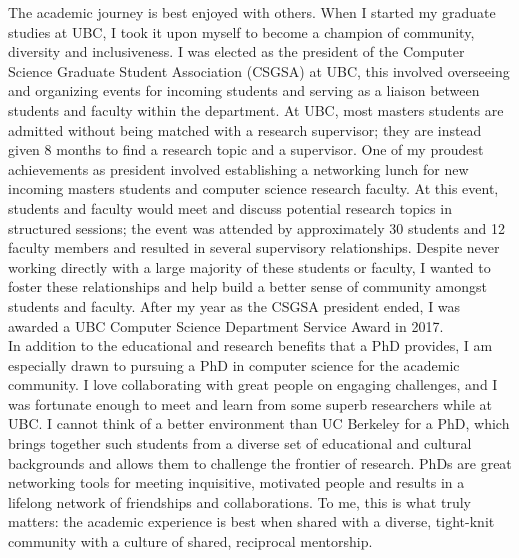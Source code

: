 \documentclass[10pt]{article} %
\begin{document}
The academic journey is best enjoyed with others. When I started my graduate studies at UBC, I took it upon myself to become a champion of community, diversity and inclusiveness. I was elected as the president of the Computer Science Graduate Student Association (CSGSA) at UBC, this involved overseeing and organizing events for incoming students and serving as a liaison between students and faculty within the department. At UBC, most masters students are admitted without being matched with a research supervisor; they are instead given 8 months to find a research topic and a supervisor. One of my proudest achievements as president involved establishing a networking lunch for new incoming masters students and computer science research faculty. At this event, students and faculty would meet and discuss potential research topics in structured sessions; the event was attended by approximately 30 students and 12 faculty members and resulted in several supervisory relationships. Despite never working directly with a large majority of these students or faculty, I wanted to foster these relationships and help build a better sense of community amongst students and faculty. After my year as the CSGSA president ended, I was awarded a UBC Computer Science Department Service Award in 2017. \\

In addition to the educational and research benefits that a PhD provides, I am especially drawn to pursuing a PhD in computer science for the academic community. I love collaborating with great people on engaging challenges, and I was fortunate enough to meet and learn from some superb researchers while at UBC. I cannot think of a better environment than UC Berkeley for a PhD, which brings together such students from a diverse set of educational and cultural backgrounds and allows them to challenge the frontier of research. PhDs are great networking tools for meeting inquisitive, motivated people and results in a lifelong network of friendships and collaborations. To me, this is what truly matters: the academic experience is best when shared with a diverse, tight-knit community with a culture of shared, reciprocal mentorship. 
\end{document}

